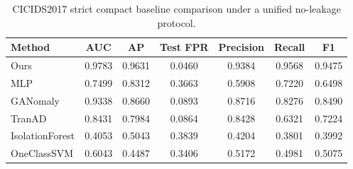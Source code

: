 \begin{table}[!t]
  \centering
  \caption{CICIDS2017 strict compact baseline comparison under a unified no-leakage protocol.}
  \label{tab:compact_baselines}
  \small
  \begin{tabular*}{\textwidth}{@{\extracolsep{\fill}}lcccccc@{}}
    \toprule
    Method & AUC & AP & Test FPR & Precision & Recall & F1 \\
    \midrule
    Ours & 0.9783 & 0.9631 & 0.0460 & 0.9384 & 0.9568 & 0.9475 \\
    MLP & 0.7499 & 0.8312 & 0.3663 & 0.5908 & 0.7220 & 0.6498 \\
    GANomaly & 0.9338 & 0.8660 & 0.0893 & 0.8716 & 0.8276 & 0.8490 \\
    TranAD & 0.8431 & 0.7984 & 0.0864 & 0.8428 & 0.6321 & 0.7224 \\
    IsolationForest & 0.4053 & 0.5043 & 0.3839 & 0.4204 & 0.3801 & 0.3992 \\
    OneClassSVM & 0.6043 & 0.4487 & 0.3406 & 0.5172 & 0.4981 & 0.5075 \\
    \bottomrule
  \end{tabular*}
\end{table}
